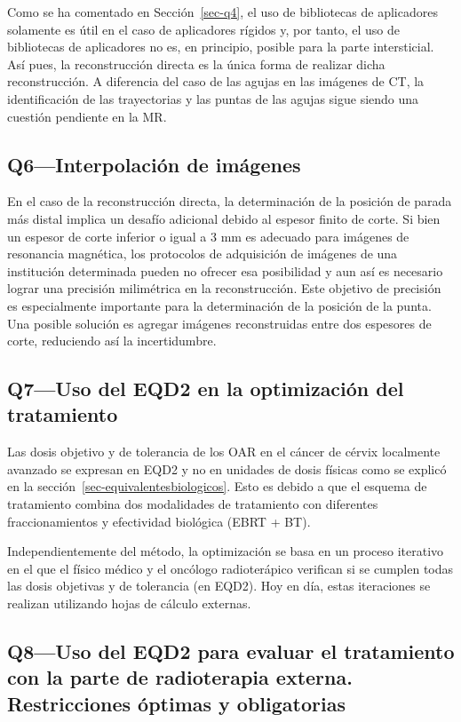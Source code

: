 \documentclass[
  a4paper,
]{scrreprt}
\begin{document}
Como se ha comentado en Sección~\ref{sec-q4}, el uso de bibliotecas de
aplicadores solamente es útil en el caso de aplicadores rígidos y, por
tanto, el uso de bibliotecas de aplicadores no es, en principio, posible
para la parte intersticial. Así pues, la reconstrucción directa es la
única forma de realizar dicha reconstrucción. A diferencia del caso de
las agujas en las imágenes de CT, la identificación de las trayectorias
y las puntas de las agujas sigue siendo una cuestión pendiente en la MR.

\hypertarget{sec-q6}{%
\subsection{Q6---Interpolación de imágenes}\label{sec-q6}}

En el caso de la reconstrucción directa, la determinación de la posición
de parada más distal implica un desafío adicional debido al espesor
finito de corte. Si bien un espesor de corte inferior o igual a 3 mm es
adecuado para imágenes de resonancia magnética, los protocolos de
adquisición de imágenes de una institución determinada pueden no ofrecer
esa posibilidad y aun así es necesario lograr una precisión milimétrica
en la reconstrucción. Este objetivo de precisión es especialmente
importante para la determinación de la posición de la punta. Una posible
solución es agregar imágenes reconstruidas entre dos espesores de corte,
reduciendo así la incertidumbre.

\hypertarget{sec-q7}{%
\subsection{Q7---Uso del EQD2 en la optimización del
tratamiento}\label{sec-q7}}

Las dosis objetivo y de tolerancia de los OAR en el cáncer de cérvix
localmente avanzado se expresan en EQD2 y no en unidades de dosis
físicas como se explicó en la sección~\ref{sec-equivalentesbiologicos}.
Esto es debido a que el esquema de tratamiento combina dos modalidades
de tratamiento con diferentes fraccionamientos y efectividad biológica
(EBRT + BT).

Independientemente del método, la optimización se basa en un proceso
iterativo en el que el físico médico y el oncólogo radioterápico
verifican si se cumplen todas las dosis objetivas y de tolerancia (en
EQD2). Hoy en día, estas iteraciones se realizan utilizando hojas de
cálculo externas.

\hypertarget{sec-q8}{%
\subsection{Q8---Uso del EQD2 para evaluar el tratamiento con la parte
de radioterapia externa. Restricciones óptimas y
obligatorias}\label{sec-q8}}
\end{document}
